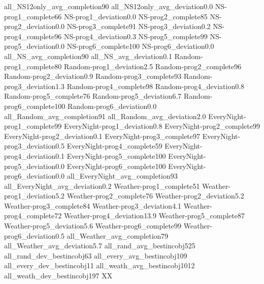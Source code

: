 {{{all_NS12only_avg_completion}{90}%
{all_NS12only_avg_deviation}{0.0}%
{NS-prog1_complete}{66}%
{NS-prog1_deviation}{0.0}%
{NS-prog2_complete}{85}%
{NS-prog2_deviation}{0.0}%
{NS-prog3_complete}{91}%
{NS-prog3_deviation}{0.2}%
{NS-prog4_complete}{96}%
{NS-prog4_deviation}{0.3}%
{NS-prog5_complete}{99}%
{NS-prog5_deviation}{0.0}%
{NS-prog6_complete}{100}%
{NS-prog6_deviation}{0.0}%
{all_NS_avg_completion}{90}%
{all_NS_avg_deviation}{0.1}%
{Random-prog1_complete}{80}%
{Random-prog1_deviation}{2.5}%
{Random-prog2_complete}{96}%
{Random-prog2_deviation}{0.9}%
{Random-prog3_complete}{93}%
{Random-prog3_deviation}{1.3}%
{Random-prog4_complete}{98}%
{Random-prog4_deviation}{0.8}%
{Random-prog5_complete}{76}%
{Random-prog5_deviation}{6.7}%
{Random-prog6_complete}{100}%
{Random-prog6_deviation}{0.0}%
{all_Random_avg_completion}{91}%
{all_Random_avg_deviation}{2.0}%
{EveryNight-prog1_complete}{99}%
{EveryNight-prog1_deviation}{0.8}%
{EveryNight-prog2_complete}{99}%
{EveryNight-prog2_deviation}{0.1}%
{EveryNight-prog3_complete}{97}%
{EveryNight-prog3_deviation}{0.5}%
{EveryNight-prog4_complete}{59}%
{EveryNight-prog4_deviation}{0.1}%
{EveryNight-prog5_complete}{100}%
{EveryNight-prog5_deviation}{0.0}%
{EveryNight-prog6_complete}{100}%
{EveryNight-prog6_deviation}{0.0}%
{all_EveryNight_avg_completion}{93}%
{all_EveryNight_avg_deviation}{0.2}%
{Weather-prog1_complete}{51}%
{Weather-prog1_deviation}{5.2}%
{Weather-prog2_complete}{76}%
{Weather-prog2_deviation}{5.2}%
{Weather-prog3_complete}{84}%
{Weather-prog3_deviation}{4.1}%
{Weather-prog4_complete}{72}%
{Weather-prog4_deviation}{13.9}%
{Weather-prog5_complete}{87}%
{Weather-prog5_deviation}{5.6}%
{Weather-prog6_complete}{99}%
{Weather-prog6_deviation}{0.5}%
{all_Weather_avg_completion}{79}%
{all_Weather_avg_deviation}{5.7}%
{all_rand_avg_bestincobj}{525}%
{all_rand_dev_bestincobj}{63}%
{all_every_avg_bestincobj}{109}%
{all_every_dev_bestincobj}{11}%
{all_weath_avg_bestincobj}{1012}%
{all_weath_dev_bestincobj}{197}%
}{{\color{red}XX}}  %
} 
\ExplSyntaxOff 
